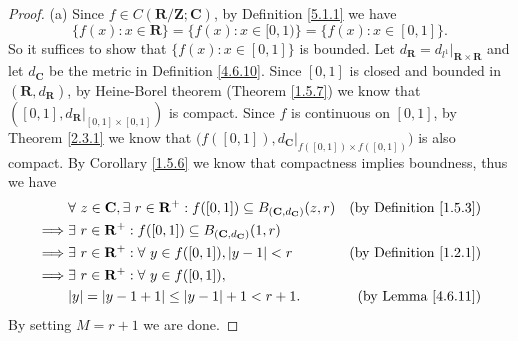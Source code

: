 \begin{proof}{(a)}
    Since \(f \in C(\mathbf{R} / \mathbf{Z} ; \mathbf{C})\), by Definition \ref{5.1.1} we have
    \[
        \big\{f(x) : x \in \mathbf{R}\big\} = \big\{f(x) : x \in [0, 1)\big\} = \big\{f(x) : x \in [0, 1]\big\}.
    \]
    So it suffices to show that \(\{f(x) : x \in [0, 1]\}\) is bounded.
    Let \(d_{\mathbf{R}} = d_{l^1}|_{\mathbf{R} \times \mathbf{R}}\) and let \(d_{\mathbf{C}}\) be the metric in Definition \ref{4.6.10}.
    Since \([0, 1]\) is closed and bounded in \((\mathbf{R}, d_{\mathbf{R}})\), by Heine-Borel theorem (Theorem \ref{1.5.7}) we know that \(([0, 1], d_{\mathbf{R}}|_{[0, 1] \times [0, 1]})\) is compact.
    Since \(f\) is continuous on \([0, 1]\), by Theorem \ref{2.3.1} we know that \(\big(f([0, 1]), d_{\mathbf{C}}|_{f([0, 1]) \times f([0, 1])}\big)\) is also compact.
    By Corollary \ref{1.5.6} we know that compactness implies boundness, thus we have
    \begin{align*}
                 & \forall\ z \in \mathbf{C}, \exists\ r \in \mathbf{R}^+ : f([0, 1]) \subseteq B_{(\mathbf{C}, d_{\mathbf{C}})}(z, r) & \text{(by Definition \ref{1.5.3})} \\
        \implies & \exists\ r \in \mathbf{R}^+ : f([0, 1]) \subseteq B_{(\mathbf{C}, d_{\mathbf{C}})}(1, r)                                                                 \\
        \implies & \exists\ r \in \mathbf{R}^+ : \forall\ y \in f([0, 1]), \abs*{y - 1} < r                                            & \text{(by Definition \ref{1.2.1})} \\
        \implies & \exists\ r \in \mathbf{R}^+ : \forall\ y \in f([0, 1]),                                                                                                  \\
                 & \abs*{y} = \abs*{y - 1 + 1} \leq \abs*{y - 1} + 1 < r + 1.                                                          & \text{(by Lemma \ref{4.6.11})}
    \end{align*}
    By setting \(M = r + 1\) we are done.
\end{proof}

